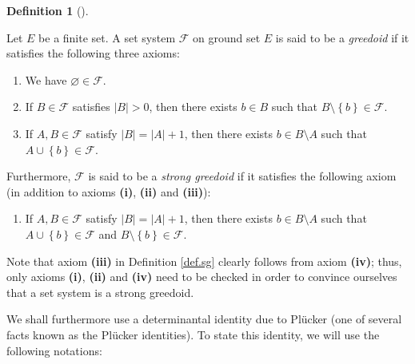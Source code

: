 \documentclass[numbers=enddot,12pt,final,onecolumn,notitlepage]{scrartcl}%
\theoremstyle{definition}
\newtheorem{defi}[theo]{Definition}
\newenvironment{definition}[1][]
{\begin{defi}[#1]\begin{leftbar}}
{\end{leftbar}\end{defi}}
\theoremstyle{plainsl}
\begin{document}
\begin{definition}
\label{def.sg}Let $E$ be a finite set. A set system $\mathcal{F}$ on ground
set $E$ is said to be a \textit{greedoid} if it satisfies the following three axioms:

\begin{enumerate}
\item[\textbf{(i)}] We have $\varnothing\in\mathcal{F}$.

\item[\textbf{(ii)}] If $B\in\mathcal{F}$ satisfies $\left\vert B\right\vert
>0$, then there exists $b\in B$ such that $B\setminus\left\{  b\right\}
\in\mathcal{F}$.

\item[\textbf{(iii)}] If $A,B\in\mathcal{F}$ satisfy $\left\vert B\right\vert
=\left\vert A\right\vert +1$, then there exists $b\in B\setminus A$ such that
$A\cup\left\{  b\right\}  \in\mathcal{F}$.
\end{enumerate}

\noindent Furthermore, $\mathcal{F}$ is said to be a \textit{strong greedoid}
if it satisfies the following axiom (in addition to axioms \textbf{(i)},
\textbf{(ii)} and \textbf{(iii)}):

\begin{enumerate}
\item[\textbf{(iv)}] If $A,B\in\mathcal{F}$ satisfy $\left\vert B\right\vert
=\left\vert A\right\vert +1$, then there exists $b\in B\setminus A$ such that
$A\cup\left\{  b\right\}  \in\mathcal{F}$ and $B\setminus\left\{  b\right\}
\in\mathcal{F}$.
\end{enumerate}
\end{definition}

Note that axiom \textbf{(iii)} in Definition \ref{def.sg} clearly follows from
axiom \textbf{(iv)}; thus, only axioms \textbf{(i)}, \textbf{(ii)} and
\textbf{(iv)} need to be checked in order to convince ourselves that a set
system is a strong greedoid.

We shall furthermore use a determinantal identity due to Pl\"{u}cker (one of
several facts known as the Pl\"{u}cker identities). To state this identity, we
will use the following notations:
\end{document}
